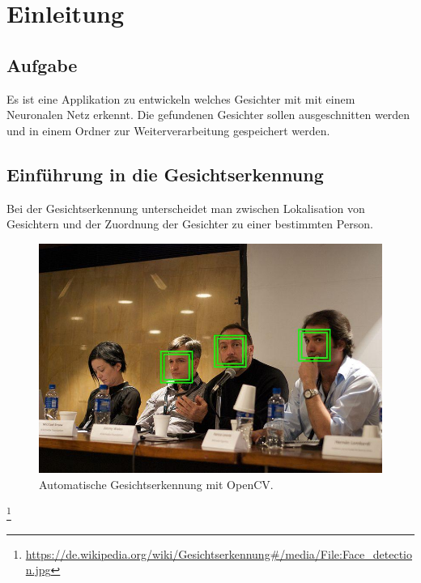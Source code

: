 \chapter{Einleitung}

\section{Aufgabe}
Es ist eine Applikation zu entwickeln welches Gesichter mit mit einem Neuronalen  Netz erkennt. Die gefundenen Gesichter sollen ausgeschnitten werden und in einem Ordner zur Weiterverarbeitung gespeichert werden.

\section{Einführung in die Gesichtserkennung}
Bei der Gesichtserkennung unterscheidet man zwischen Lokalisation von Gesichtern  und der Zuordnung der Gesichter zu einer bestimmten Person.\\%
\begin{figure}
	\includegraphics[width=1.0\textwidth]{bilder/face-detection.jpg}	
	\caption{Automatische Gesichtserkennung mit OpenCV.}
\end{figure}
\footnote{\url{https://de.wikipedia.org/wiki/Gesichtserkennung\#/media/File:Face\_detection.jpg}}


